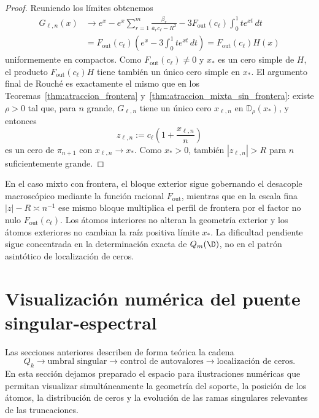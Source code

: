 \begin{proof}
	Reuniendo los límites obtenemos
	\begin{align*}
		G_{\ell,n}(x)
		 & \longrightarrow
		e^x-e^x\sum_{r=1}^m\frac{\beta_r}{\overline a_r c_\ell-R^2}
		-3F_{\mathrm{out}}(c_\ell)\int_0^1 t e^{xt}\,dt                     \\
		 & =F_{\mathrm{out}}(c_\ell)\left(e^x-3\int_0^1 t e^{xt}\,dt\right)
		=F_{\mathrm{out}}(c_\ell)H(x)
	\end{align*}
	uniformemente en compactos. Como $F_{\mathrm{out}}(c_\ell)\neq0$ y $x_*$ es un cero simple de $H$, el producto $F_{\mathrm{out}}(c_\ell)H$ tiene también un único cero simple en $x_*$. El argumento final de Rouché es exactamente el mismo que en los Teoremas~\ref{thm:atraccion_frontera} y~\ref{thm:atraccion_mixta_sin_frontera}: existe $\rho>0$ tal que, para $n$ grande, $G_{\ell,n}$ tiene un único cero $x_{\ell,n}$ en $\mathbb D_\rho(x_*)$, y entonces
	\[
		z_{\ell,n}:=c_\ell\left(1+\frac{x_{\ell,n}}{n}\right)
	\]
	es un cero de $\pi_{n+1}$ con $x_{\ell,n}\to x_*$. Como $x_*>0$, también $|z_{\ell,n}|>R$ para $n$ suficientemente grande.
\end{proof}

\begin{rmk}\label{rem:atomos_interiores}
	En el caso mixto con frontera, el bloque exterior sigue gobernando el desacople macroscópico mediante la función racional $F_{\mathrm{out}}$, mientras que en la escala fina $|z|-R\asymp n^{-1}$ ese mismo bloque multiplica el perfil de frontera por el factor no nulo $F_{\mathrm{out}}(c_\ell)$. Los átomos interiores no alteran la geometría exterior y los átomos exteriores no cambian la raíz positiva límite $x_*$. La dificultad pendiente sigue concentrada en la determinación exacta de $Q_m(\D)$, no en el patrón asintótico de localización de ceros.
\end{rmk}

\section{Visualización numérica del puente singular-espectral}

Las secciones anteriores describen de forma teórica la cadena
\[
	Q_k\longrightarrow \text{umbral singular}\longrightarrow \text{control de autovalores}\longrightarrow \text{localización de ceros}.
\]
En esta sección dejamos preparado el espacio para ilustraciones numéricas que permitan visualizar simultáneamente la geometría del soporte, la posición de los átomos, la distribución de ceros y la evolución de las ramas singulares relevantes de las truncaciones.

